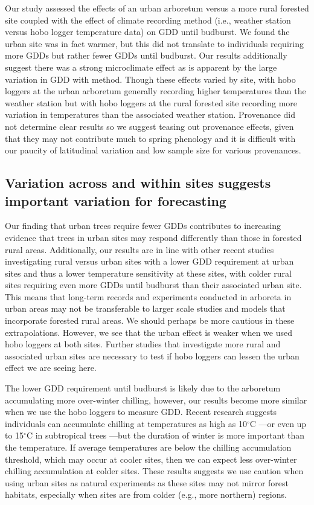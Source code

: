\documentclass{article}\usepackage[]{graphicx}\usepackage[]{color}
\begin{document}
Our study assessed the effects of an urban arboretum versus a more rural forested site coupled with the effect of climate recording method (i.e., weather station versus hobo logger temperature data) on GDD until budburst. We found the urban site was in fact warmer, but this did not translate to individuals requiring more GDDs but rather fewer GDDs until budburst. Our results additionally suggest there was a strong microclimate effect as is apparent by the large variation in GDD with method. Though these effects varied by site, with hobo loggers at the urban arboretum generally recording higher temperatures than the weather station but with hobo loggers at the rural forested site recording more variation in temperatures than the associated weather station. Provenance did not determine clear results so we suggest teasing out provenance effects, given that they may not contribute much to spring phenology \citep{Gauzere2017} and it is difficult with our paucity of latitudinal variation and low sample size for various provenances. 

\subsection*{Variation across and within sites suggests important variation for forecasting} 
Our finding that urban trees require fewer GDDs contributes to increasing evidence that trees in urban sites may respond differently than those in forested rural areas. Additionally, our results are in line with other recent studies investigating rural versus urban sites with a lower GDD requirement at urban sites and thus a lower temperature sensitivity \citep{Meng2020} at these sites, with colder rural sites requiring even more GDDs until budburst than their associated urban site. This means that long-term records and experiments conducted in arboreta in urban areas may not be transferable to larger scale studies and models that incorporate forested rural areas. We should perhaps be more cautious in these extrapolations. However, we see that the urban effect is weaker when we used hobo loggers at both sites. Further studies that investigate more rural and associated urban sites are necessary to test if hobo loggers can lessen the urban effect we are seeing here.
  
The lower GDD requirement until budburst is likely due to the arboretum accumulating more over-winter chilling, however, our results become more similar when we use the hobo loggers to measure GDD. Recent research suggests individuals can accumulate chilling at temperatures as high as 10$^{\circ}$C \citep{Baumgarten2021}---or even up to 15$^{\circ}$C in subtropical trees \citep{Zhang2021}---but the duration of winter is more important than the temperature. If average temperatures are below the chilling accumulation threshold, which may occur at cooler sites, then we can expect less over-winter chilling accumulation at colder sites. These results suggests we use caution when using urban sites as natural experiments as these sites may not mirror forest habitats, especially when sites are from colder (e.g., more northern) regions.
  
\end{document}
